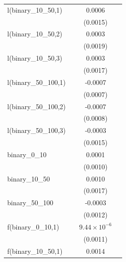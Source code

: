 \begin{tabular}{lccc}
   l(binary\_10\_50,1)                    &          & 0.0006                &   \\   
                                          &          & (0.0015)              &   \\   
   l(binary\_10\_50,2)                    &          & 0.0003                &   \\   
                                          &          & (0.0019)              &   \\   
   l(binary\_10\_50,3)                    &          & 0.0003                &   \\   
                                          &          & (0.0017)              &   \\   
   l(binary\_50\_100,1)                   &          & -0.0007               &   \\   
                                          &          & (0.0007)              &   \\   
   l(binary\_50\_100,2)                   &          & -0.0007               &   \\   
                                          &          & (0.0008)              &   \\   
   l(binary\_50\_100,3)                   &          & -0.0003               &   \\   
                                          &          & (0.0015)              &   \\   
   binary\_0\_10                          &          & 0.0001                &   \\   
                                          &          & (0.0010)              &   \\   
   binary\_10\_50                         &          & 0.0010                &   \\   
                                          &          & (0.0017)              &   \\   
   binary\_50\_100                        &          & -0.0003               &   \\   
                                          &          & (0.0012)              &   \\   
   f(binary\_0\_10,1)                     &          & $9.44\times 10^{-6}$  &   \\   
                                          &          & (0.0011)              &   \\   
   f(binary\_10\_50,1)                    &          & 0.0014                &   \\   

\end{tabular}
